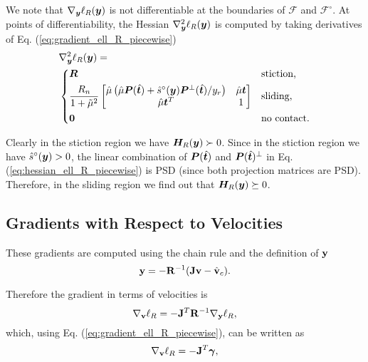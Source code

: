 We note that $\nabla_{\bm{y}}\ell_R({\bm{y}})$ is not differentiable at the
boundaries of $\mathcal{F}$ and $\mathcal{F}^\circ$. At points of
differentiability, the Hessian $\nabla_{\bm{y}}^2\ell_R({\bm{y}})$ is computed by
taking derivatives of Eq. (\ref{eq:gradient_ell_R_piecewise})
\begin{align}
	&\nabla_\vf{y}^2\ell_R(\vf{y}) = 
	\label{eq:hessian_ell_R_piecewise}\\
&\begin{dcases}
	\vf{R} & 
	\text{stiction,}\\
	\frac{R_n}{1+\tilde\mu^2}
	\begin{bmatrix}
		\hat{\mu}\left(\hat{\mu}\vf{P}(\hat{\vf{t}})+\hat{s}^\circ(\vf{y})\vf{P}^\perp(\hat{\vf{t}})/y_r\right) & 
		\hat{\mu}\vf{t}\\
		\hat{\mu}\vf{t}^T & 
		1\\
	\end{bmatrix} &
	\text{sliding,}\\
    \vf{0} & \text{no contact.}
\end{dcases}\nonumber
\end{align}

Clearly in the stiction region we have ${\bm{H}}_R({\bm{y}})\succ 0$.
Since in the stiction region we have $\hat{s}^\circ({\bm{y}})>0$, the linear
combination of ${\bm{P}}(\hat{{\bm{t}}})$ and ${\bm{P}}(\hat{{\bm{t}}})^\perp$ in Eq.
(\ref{eq:hessian_ell_R_piecewise}) is PSD (since both projection matrices are
PSD). Therefore, in the sliding region we find out that
${\bm{H}}_R({\bm{y}})\succeq 0$.

\subsection{Gradients with Respect to Velocities}
These gradients are computed using the chain rule and the definition of ${\mathbf{y}}$
\begin{equation*}
	{\mathbf{y}}=-{\mathbf{R}}^{-1}({\mathbf{J}}{\mathbf{v}} - \hat{{\mathbf{v}}}_c).
\end{equation*}

Therefore the gradient in terms of velocities is
\begin{equation}
	\nabla_\mf{v}\ell_R = -\mf{J}^T\mf{R}^{-1}\nabla_\mf{y}\ell_R,
	\label{eq:ell_velocity_gradient}
\end{equation}
which, using Eq. (\ref{eq:gradient_ell_R_piecewise}), can be written as
\begin{equation}
	\nabla_\mf{v}\ell_R = -\mf{J}^T\bgamma,
	\label{eq:ell_velocity_gradient_simplified}
\end{equation}

